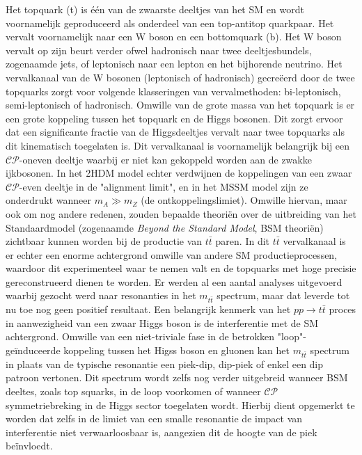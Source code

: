 Het topquark (t) is \'e\'en van de zwaarste deeltjes van het SM en wordt
voornamelijk geproduceerd als onderdeel van een top-antitop quarkpaar. 
Het vervalt voornamelijk naar een
W boson en een bottomquark (b). Het W boson vervalt op zijn beurt verder ofwel
hadronisch naar twee deeltjesbundels, zogenaamde jets, of leptonisch naar een
lepton en het bijhorende 
neutrino. Het vervalkanaal van de W bosonen (leptonisch of hadronisch)
gecre\"eerd door de twee topquarks zorgt voor volgende klasseringen van
vervalmethoden: bi-leptonisch, semi-leptonisch of hadronisch. Omwille van de
grote massa van het topquark is er een grote koppeling tussen het topquark
en de Higgs bosonen. Dit zorgt ervoor dat een significante fractie van de
Higgsdeeltjes vervalt naar twee topquarks als dit kinematisch toegelaten
is. Dit vervalkanaal is voornamelijk belangrijk bij een $\mathcal{CP}$-oneven
deeltje  waarbij er niet kan gekoppeld worden aan de zwakke
ijkbosonen. In het 2HDM model echter verdwijnen de koppelingen van
een zwaar $\mathcal{CP}$-even deeltje in de "alignment limit", en in het MSSM
model zijn ze onderdrukt wanneer $m_A \gg m_Z$ (de
ontkoppelingslimiet). Omwille hiervan, maar ook om nog andere redenen, zouden
bepaalde theori\"en over de uitbreiding van het Standaardmodel (zogenaamde
{\it Beyond the Standard Model}, BSM theori\"en) zichtbaar kunnen worden bij
de productie van $t\bar t$ 
paren. In dit $t\bar t$ vervalkanaal is er echter een enorme achtergrond omwille
van andere SM productieprocessen, waardoor dit experimenteel
waar te nemen valt en de topquarks met hoge
precisie gereconstrueerd dienen te worden. Er werden al een aantal analyses
uitgevoerd waarbij gezocht werd naar 
resonanties in het $m_{t\bar t}$ spectrum, maar dat leverde tot nu toe nog geen positief
resultaat. Een belangrijk kenmerk van het $pp \rightarrow t\bar t$
proces in aanwezigheid van een zwaar Higgs boson is de interferentie met
de SM achtergrond. Omwille van een niet-triviale fase in de betrokken
"loop"-ge\"induceerde koppeling tussen het Higss boson en gluonen kan het
$m_{t\bar t}$ spectrum in plaats van de typische resonantie een piek-dip,
dip-piek of enkel een dip patroon vertonen. Dit spectrum wordt zelfs nog
verder uitgebreid wanneer BSM deeltes, zoals top squarks, in de loop voorkomen
of wanneer $\mathcal{CP}$ symmetriebreking in de Higgs sector
toegelaten wordt. Hierbij dient opgemerkt te worden dat zelfs in de limiet van
een smalle resonantie de impact van interferentie niet verwaarloosbaar is,
aangezien dit de hoogte van de piek be\"invloedt.  

